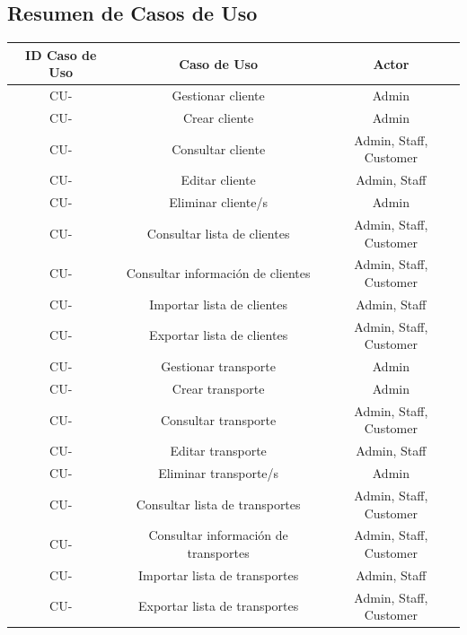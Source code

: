 \documentclass{article}
\begin{document}
    \subsection{Resumen de Casos de Uso}
    \newcommand\rownumber{\stepcounter{magicrownumbers}\arabic{magicrownumbers}}
    \begin{center}
        \begin{longtable}{ |c|c|c| }
            \hline

            \rowcolor{lightgray}
            ID Caso de Uso & Caso de Uso & Actor \\
            \endhead

            \hline
            \endfoot

            \hline
            CU-\rownumber & Gestionar cliente & Admin \\
            CU-\rownumber & Crear cliente & Admin \\
            CU-\rownumber & Consultar cliente & Admin, Staff, Customer \\
            CU-\rownumber & Editar cliente & Admin, Staff \\
            CU-\rownumber & Eliminar cliente/s & Admin \\
            CU-\rownumber & Consultar lista de clientes & Admin, Staff, Customer \\
            CU-\rownumber & Consultar información de clientes & Admin, Staff, Customer \\
            CU-\rownumber & Importar lista de clientes & Admin, Staff \\
            CU-\rownumber & Exportar lista de clientes & Admin, Staff, Customer \\

            CU-\rownumber & Gestionar transporte & Admin \\
            CU-\rownumber & Crear transporte & Admin \\
            CU-\rownumber & Consultar transporte & Admin, Staff, Customer \\
            CU-\rownumber & Editar transporte & Admin, Staff \\
            CU-\rownumber & Eliminar transporte/s & Admin \\
            CU-\rownumber & Consultar lista de transportes & Admin, Staff, Customer \\
            CU-\rownumber & Consultar información de transportes & Admin, Staff, Customer \\
            CU-\rownumber & Importar lista de transportes & Admin, Staff \\
            CU-\rownumber & Exportar lista de transportes & Admin, Staff, Customer \\


\end{longtable}
\end{center}
\end{document}
